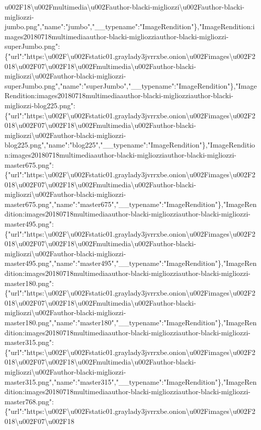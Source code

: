 u002F18\textbackslash{}u002Fmultimedia\textbackslash{}u002Fauthor-blacki-migliozzi\textbackslash{}u002Fauthor-blacki-migliozzi-jumbo.png","name":"jumbo","\_\_typename":"ImageRendition"\},"ImageRendition:images20180718multimediaauthor-blacki-migliozziauthor-blacki-migliozzi-superJumbo.png":\{"url":"https:\textbackslash{}u002F\textbackslash{}u002Fstatic01.graylady3jvrrxbe.onion\textbackslash{}u002Fimages\textbackslash{}u002F2018\textbackslash{}u002F07\textbackslash{}u002F18\textbackslash{}u002Fmultimedia\textbackslash{}u002Fauthor-blacki-migliozzi\textbackslash{}u002Fauthor-blacki-migliozzi-superJumbo.png","name":"superJumbo","\_\_typename":"ImageRendition"\},"ImageRendition:images20180718multimediaauthor-blacki-migliozziauthor-blacki-migliozzi-blog225.png":\{"url":"https:\textbackslash{}u002F\textbackslash{}u002Fstatic01.graylady3jvrrxbe.onion\textbackslash{}u002Fimages\textbackslash{}u002F2018\textbackslash{}u002F07\textbackslash{}u002F18\textbackslash{}u002Fmultimedia\textbackslash{}u002Fauthor-blacki-migliozzi\textbackslash{}u002Fauthor-blacki-migliozzi-blog225.png","name":"blog225","\_\_typename":"ImageRendition"\},"ImageRendition:images20180718multimediaauthor-blacki-migliozziauthor-blacki-migliozzi-master675.png":\{"url":"https:\textbackslash{}u002F\textbackslash{}u002Fstatic01.graylady3jvrrxbe.onion\textbackslash{}u002Fimages\textbackslash{}u002F2018\textbackslash{}u002F07\textbackslash{}u002F18\textbackslash{}u002Fmultimedia\textbackslash{}u002Fauthor-blacki-migliozzi\textbackslash{}u002Fauthor-blacki-migliozzi-master675.png","name":"master675","\_\_typename":"ImageRendition"\},"ImageRendition:images20180718multimediaauthor-blacki-migliozziauthor-blacki-migliozzi-master495.png":\{"url":"https:\textbackslash{}u002F\textbackslash{}u002Fstatic01.graylady3jvrrxbe.onion\textbackslash{}u002Fimages\textbackslash{}u002F2018\textbackslash{}u002F07\textbackslash{}u002F18\textbackslash{}u002Fmultimedia\textbackslash{}u002Fauthor-blacki-migliozzi\textbackslash{}u002Fauthor-blacki-migliozzi-master495.png","name":"master495","\_\_typename":"ImageRendition"\},"ImageRendition:images20180718multimediaauthor-blacki-migliozziauthor-blacki-migliozzi-master180.png":\{"url":"https:\textbackslash{}u002F\textbackslash{}u002Fstatic01.graylady3jvrrxbe.onion\textbackslash{}u002Fimages\textbackslash{}u002F2018\textbackslash{}u002F07\textbackslash{}u002F18\textbackslash{}u002Fmultimedia\textbackslash{}u002Fauthor-blacki-migliozzi\textbackslash{}u002Fauthor-blacki-migliozzi-master180.png","name":"master180","\_\_typename":"ImageRendition"\},"ImageRendition:images20180718multimediaauthor-blacki-migliozziauthor-blacki-migliozzi-master315.png":\{"url":"https:\textbackslash{}u002F\textbackslash{}u002Fstatic01.graylady3jvrrxbe.onion\textbackslash{}u002Fimages\textbackslash{}u002F2018\textbackslash{}u002F07\textbackslash{}u002F18\textbackslash{}u002Fmultimedia\textbackslash{}u002Fauthor-blacki-migliozzi\textbackslash{}u002Fauthor-blacki-migliozzi-master315.png","name":"master315","\_\_typename":"ImageRendition"\},"ImageRendition:images20180718multimediaauthor-blacki-migliozziauthor-blacki-migliozzi-master768.png":\{"url":"https:\textbackslash{}u002F\textbackslash{}u002Fstatic01.graylady3jvrrxbe.onion\textbackslash{}u002Fimages\textbackslash{}u002F2018\textbackslash{}u002F07\textbackslash{}u002F18\textbac